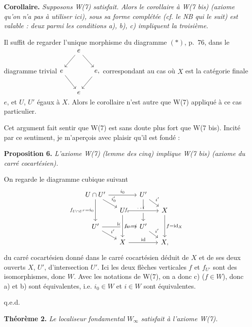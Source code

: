 \documentclass[11pt]{article}
\newcommand{\printedpage}[1]{\marginpar{\footnotesize p.~#1}}
\newcommand{\msp}[1]{\marginpar{\footnotesize [#1]}}
\begin{document}
\textbf{Corollaire.} \textit{Supposons \textup{W(7)} satisfait. Alors le corollaire à \textup{W(7 bis)} (axiome qu'on n'a pas à utiliser ici), sous sa forme complétée (cf. le NB qui le suit) est valable : deux parmi les conditions a), b), c) impliquent la troisième.}

Il suffit de regarder l'unique morphisme du diagramme $(*)$, p.~76, dans le diagramme trivial\quad $\vcenter{\hbox{\begin{tikzcd}[column sep=small]
& e \arrow[dl] \arrow[dr] & \\
e \arrow[dr] & & e, \arrow[dl] \\
& e &
\end{tikzcd}}}$\quad correspondant au cas où $X$ est la catégorie finale $e$, et $U$, $U'$ égaux à $X$. Alors le corollaire n'est autre que W(7) appliqué à ce cas particulier.

Cet argument fait sentir que W(7) est sans doute plus fort que W(7 bis). Incité par ce sentiment, je m'aperçois avec plaisir qu'il est fondé :

\printedpage{57}

\msp{page 78}
\textbf{Proposition 6.} \textit{L'axiome \textup{W(7)} (lemme des cinq) implique \textup{W(7 bis)} (axiome du carré cocartésien).}

On regarde le diagramme cubique suivant
\[
\begin{tikzcd}[row sep=small, column sep=small]
U\cap U' \arrow[rr, "i_0"] \arrow[dr, "i'_0"] \arrow[dd, "f_{U\cap U'}=i_0"'] & & U' \arrow[dr, "i'"] \arrow[dd, "f_{U'}=\mathrm{id}"'] & \\
& U \arrow[rr, crossing over, "i"] & & X \arrow[dd, "f=\mathrm{id}_X"] \\
U' \arrow[rr, "\mathrm{id}"] \arrow[dr, "i'"] & & U' \arrow[dr, "i'"] & \\
& X \arrow[rr, "\mathrm{id}"] \arrow[from=uu, crossing over, "f_U=i"] & & X,
\end{tikzcd}
\]
du carré cocartésien donné dans le carré cocartésien déduit de $X$ et de ses deux ouverts $X$, $U'$, d'intersection $U'$. Ici les deux flèches verticales $f$ et $f_{U'}$ sont des isomorphismes, donc $W$. Avec les notations de W(7), on a donc c) ($f\in W$), donc a) et b) sont équivalentes, i.e. $i_0\in W$ et $i\in W$ sont équivalentes.

\hfill q.e.d.

\textbf{Théorème 2.} \textit{Le localiseur fondamental $W_\infty$ satisfait à l'axiome \textup{W(7)}.}
\end{document}
